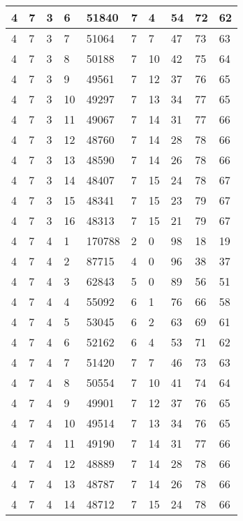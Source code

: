 \begin{table}[!ht]
\begin{tabular}{|l|l|l|l|l|l|l|l|l|l|}
        4 & 7 & 3 & 6 & 51840 & 7 & 4 & 54 & 72 & 62 \\ \hline
        4 & 7 & 3 & 7 & 51064 & 7 & 7 & 47 & 73 & 63 \\ \hline
        4 & 7 & 3 & 8 & 50188 & 7 & 10 & 42 & 75 & 64 \\ \hline
        4 & 7 & 3 & 9 & 49561 & 7 & 12 & 37 & 76 & 65 \\ \hline
        4 & 7 & 3 & 10 & 49297 & 7 & 13 & 34 & 77 & 65 \\ \hline
        4 & 7 & 3 & 11 & 49067 & 7 & 14 & 31 & 77 & 66 \\ \hline
        4 & 7 & 3 & 12 & 48760 & 7 & 14 & 28 & 78 & 66 \\ \hline
        4 & 7 & 3 & 13 & 48590 & 7 & 14 & 26 & 78 & 66 \\ \hline
        4 & 7 & 3 & 14 & 48407 & 7 & 15 & 24 & 78 & 67 \\ \hline
        4 & 7 & 3 & 15 & 48341 & 7 & 15 & 23 & 79 & 67 \\ \hline
        4 & 7 & 3 & 16 & 48313 & 7 & 15 & 21 & 79 & 67 \\ \hline
        4 & 7 & 4 & 1 & 170788 & 2 & 0 & 98 & 18 & 19 \\ \hline
        4 & 7 & 4 & 2 & 87715 & 4 & 0 & 96 & 38 & 37 \\ \hline
        4 & 7 & 4 & 3 & 62843 & 5 & 0 & 89 & 56 & 51 \\ \hline
        4 & 7 & 4 & 4 & 55092 & 6 & 1 & 76 & 66 & 58 \\ \hline
        4 & 7 & 4 & 5 & 53045 & 6 & 2 & 63 & 69 & 61 \\ \hline
        4 & 7 & 4 & 6 & 52162 & 6 & 4 & 53 & 71 & 62 \\ \hline
        4 & 7 & 4 & 7 & 51420 & 7 & 7 & 46 & 73 & 63 \\ \hline
        4 & 7 & 4 & 8 & 50554 & 7 & 10 & 41 & 74 & 64 \\ \hline
        4 & 7 & 4 & 9 & 49901 & 7 & 12 & 37 & 76 & 65 \\ \hline
        4 & 7 & 4 & 10 & 49514 & 7 & 13 & 34 & 76 & 65 \\ \hline
        4 & 7 & 4 & 11 & 49190 & 7 & 14 & 31 & 77 & 66 \\ \hline
        4 & 7 & 4 & 12 & 48889 & 7 & 14 & 28 & 78 & 66 \\ \hline
        4 & 7 & 4 & 13 & 48787 & 7 & 14 & 26 & 78 & 66 \\ \hline
        4 & 7 & 4 & 14 & 48712 & 7 & 15 & 24 & 78 & 66 \\ \hline

\end{tabular}
\end{table}
